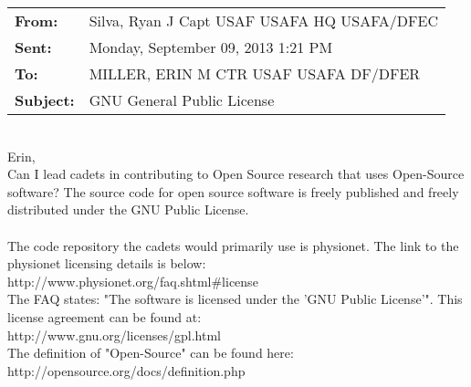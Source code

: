 \documentclass[10pt]{article}
\begin{document}
\noindent \begin{tabu} to \textwidth{l X[l]}
 
  \textbf{From:} & Silva, Ryan J Capt USAF USAFA HQ USAFA/DFEC  \\
  \textbf{Sent:} & Monday, September 09, 2013 1:21 PM \\
  \textbf{To:} & MILLER, ERIN M CTR USAF USAFA DF/DFER \\
  \textbf{Subject:} & GNU General Public License \\
\end{tabu}
\hspace{0pt} \\

Erin, \\

Can I lead cadets in contributing to Open Source research that uses Open-Source software? The source code for open source software is freely published and freely distributed under the GNU Public License. \\
 \\
The code repository the cadets would primarily use is physionet. The link to the physionet licensing details is below: \\

http://www.physionet.org/faq.shtml\#license \\

\noindent The FAQ states: "The software is licensed under the 'GNU Public License'". This license agreement can be found at: \\

http://www.gnu.org/licenses/gpl.html \\

\noindent The definition of "Open-Source" can be found here: \\

http://opensource.org/docs/definition.php \\
\end{document}
